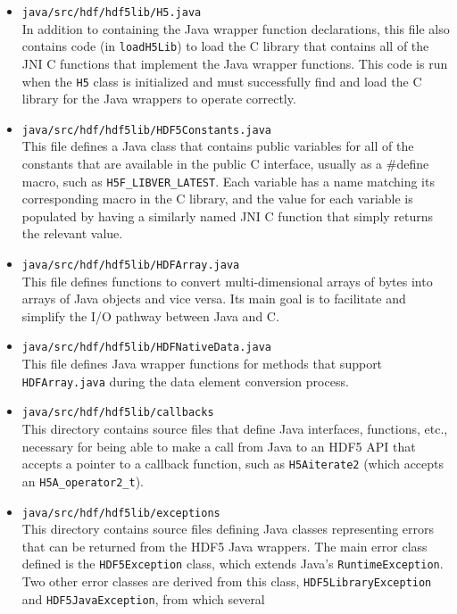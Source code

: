 \begin{itemize}
  \item \texttt{java/src/hdf/hdf5lib/H5.java} \\
    In addition to containing the Java wrapper function declarations, this file also contains
    code (in \texttt{loadH5Lib}) to load the C library that contains all of the JNI C functions
    that implement the Java wrapper functions. This code is run when the \texttt{H5} class is
    initialized and must successfully find and load the C library for the Java wrappers to
    operate correctly.
  \item \texttt{java/src/hdf/hdf5lib/HDF5Constants.java} \\
    This file defines a Java class that contains public variables for all of the constants that
    are available in the public C interface, usually as a \#define macro, such as
    \texttt{H5F\_LIBVER\_LATEST}. Each variable has a name matching its corresponding macro in
    the C library, and the value for each variable is populated by having a similarly named
    JNI C function that simply returns the relevant value.
  \item \texttt{java/src/hdf/hdf5lib/HDFArray.java} \\
    This file defines functions to convert multi-dimensional arrays of bytes into
    arrays of Java objects and vice versa. Its main goal is to facilitate and simplify the
    I/O pathway between Java and C.
  \item \texttt{java/src/hdf/hdf5lib/HDFNativeData.java} \\
    This file defines Java wrapper functions for methods that support \texttt{HDFArray.java}
    during the data element conversion process. 
  \item \texttt{java/src/hdf/hdf5lib/callbacks} \\
    This directory contains source files that define Java interfaces, functions, etc., necessary
    for being able to make a call from Java to an HDF5 API that accepts a pointer to a callback
    function, such as \texttt{H5Aiterate2} (which accepts an \texttt{H5A\_operator2\_t}).
  \item \texttt{java/src/hdf/hdf5lib/exceptions} \\
    This directory contains source files defining Java classes representing errors that
    can be returned from the HDF5 Java wrappers. The main error class defined is the \texttt{HDF5Exception}
    class, which extends Java's \texttt{RuntimeException}. Two other
    error classes are derived from this class, \texttt{HDF5LibraryException} and \texttt{HDF5JavaException}, from which several

\end{itemize}
